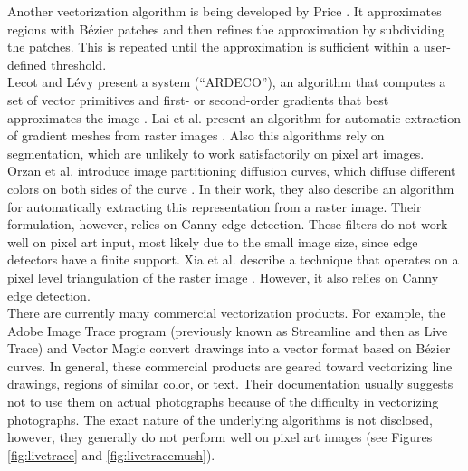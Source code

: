 \documentclass[]{usiinfbachelorproject}
\begin{document}
Another vectorization algorithm is being developed by Price \cite{Price2006}. It approximates regions with B\'ezier patches and then refines the approximation by subdividing the patches. This is repeated until the approximation is sufficient within a user-defined threshold.\\
Lecot and L\'evy present a system (``ARDECO''), an algorithm that computes a set of vector primitives and first- or second-order gradients that best approximates the image \cite{Lecot2006}. Lai et al. present an algorithm for automatic extraction of gradient meshes from raster images \cite{Lai2009}. Also this algorithms rely on segmentation, which are unlikely to work satisfactorily on pixel art images.\\
Orzan et al. introduce image partitioning diffusion curves, which diffuse different colors on both sides of the curve \cite{Orzan2008}. In their work, they also describe an algorithm for automatically extracting this representation from a raster image. Their formulation, however, relies on Canny edge detection. These filters do not work well on pixel art input, most likely due to the small image size, since edge detectors have a finite support. Xia et al. describe a technique that operates on a pixel level triangulation of the raster image \cite{Xia2009}. However, it also relies on Canny edge detection.\\

There are currently many commercial vectorization products. For example, the Adobe Image Trace program (previously known as Streamline and then as Live Trace) \cite{Adobe2012} and Vector Magic \cite{Vector2010} convert drawings into a vector format based on B\'ezier curves. In general, these commercial products are geared toward vectorizing line drawings, regions of similar color, or text. Their documentation usually suggests not to use them on actual photographs because of the difficulty in vectorizing photographs. The exact nature of the underlying algorithms is not disclosed, however, they generally do not perform well on pixel art images (see Figures \ref{fig:livetrace} and \ref{fig:livetracemush}).
\end{document}
